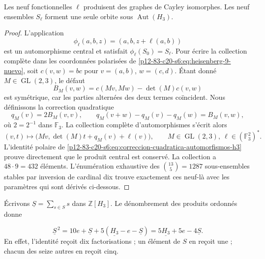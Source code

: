 \begin{theorem}
\label{p12-83-c20-s6:thm:independencia-calibre-e6}
Les neuf fonctionnelles \(\ell\) produisent des graphes de Cayley isomorphes. Les
neuf ensembles \(S_\ell\) forment une seule orbite sous
\(\operatorname{Aut}(H_3)\).
\end{theorem}

\begin{proof}
L'application
\[
 \phi_\ell(a,b,z)=(a,b,z+\ell(a,b))
\]
est un automorphisme central et satisfait
\(\phi_\ell(S_0)=S_\ell\). Pour écrire la collection complète dans les
coordonnées polarisées de \cref{p12-83-c20-s6:eq:heisenberg-9-nuevo}, soit
\(c(v,w)=b c\) pour \(v=(a,b)\), \(w=(c,d)\). Étant donné
\(M\in\operatorname{GL}(2,3)\), le défaut
\[
 B_M(v,w)=c(Mv,Mw)-\det(M)c(v,w)
\]
est symétrique, car les parties alternées des deux termes coïncident. Nous définissons la correction quadratique
\begin{equation}
 q_M(v)=2B_M(v,v),
 \qquad
 q_M(v+w)-q_M(v)-q_M(w)=B_M(v,w),
 \label{p12-83-c20-s6:eq:correccion-cuadratica-automorfismos-h3}
\end{equation}
où \(2=2^{-1}\) dans \(\mathbb F_3\). La collection complète
d’automorphismes s’écrit alors
\begin{equation}
 (v,t)\longmapsto
 \bigl(Mv,\det(M)t+q_M(v)+\ell(v)\bigr),
 \qquad M\in\operatorname{GL}(2,3),\
 \ell\in(\mathbb F_3^2)^*.
 \label{p12-83-c20-s6:eq:automorfismos-h3-completos}
\end{equation}
L’identité polaire de \cref{p12-83-c20-s6:eq:correccion-cuadratica-automorfismos-h3}
prouve directement que le produit central est conservé. La collection a
\(48\cdot9=432\) éléments. L’énumération exhaustive des
\(\binom{13}{5}=1287\) sous-ensembles stables par inversion de cardinal dix
trouve exactement ces neuf-là avec les paramètres qui sont dérivés
ci-dessous.
\end{proof}

Écrivons \(\underline S=\sum_{s\in S}s\) dans
\(\mathbb Z[H_3]\). Le dénombrement des produits ordonnés donne

\begin{equation}
 \underline S^{\,2}
 =10e+\underline S+5(\underline{H_3}-e-\underline S)
 =5\underline{H_3}+5e-4\underline S.
 \label{p12-83-c20-s6:eq:identidad-grupo-schlafli-nueva}
\end{equation}
En effet, l'identité reçoit dix factorisations ; un élément de \(S\) en reçoit une ; chacun des seize autres en reçoit cinq.

